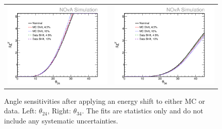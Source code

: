 \begin{figure}[htb]
  \centering
  \begin{tabular}{c c}
    \includegraphics[width=.47\textwidth]{figures/EShift24.png} &
    \includegraphics[width=.47\textwidth]{figures/EShift34.png} \\
  \end{tabular}
  \caption[Angle Sensitivities for Shifted Energy Spectra]{Angle sensitivities after applying an energy shift to either MC or data. Left: $\theta_{24}$, Right: $\theta_{34}$. The fits are statistics only and do not include any systematic uncertainties.}
  \label{fig:1D2434Shift}
\end{figure}


